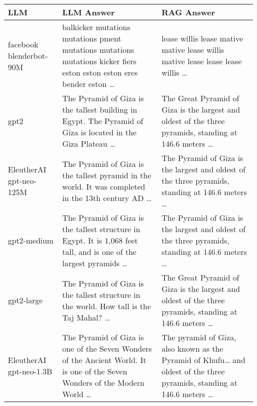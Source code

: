 \documentclass[11pt]{wseas}
\begin{document}
\begin{longtable}[]{@{}
  >{\raggedright\arraybackslash}p{}
  >{\raggedright\arraybackslash}p{}
  >{\raggedright\arraybackslash}p{}@{}}
\toprule\noalign{}
\begin{minipage}[b]{\linewidth}\raggedright
LLM
\end{minipage} & \begin{minipage}[b]{\linewidth}\raggedright
LLM Answer
\end{minipage} & \begin{minipage}[b]{\linewidth}\raggedright
RAG Answer
\end{minipage} \\
\midrule\noalign{}
\endhead
\bottomrule\noalign{}
\endlastfoot
facebook blenderbot-90M & balkicker mutations mutations pment mutations
mutations mutations kicker fiers eston eston eston eres bender eston
\ldots{} & lease willis lease mative mative lease willis mative lease
lease lease willis \ldots{} \\
gpt2 & The Pyramid of Giza is the tallest building in Egypt. The Pyramid
of Giza is located in the Giza Plateau \ldots{} & The Great Pyramid of
Giza is the largest and oldest of the three pyramids, standing at 146.6
meters \ldots{} \\
EleutherAI gpt-neo-125M & The Pyramid of Giza is the tallest pyramid in
the world. It was completed in the 13th century AD \ldots{} & The
Pyramid of Giza is the largest and oldest of the three pyramids,
standing at 146.6 meters \ldots{} \\
gpt2-medium & The Pyramid of Giza is the tallest structure in Egypt. It
is 1,068 feet tall, and is one of the largest pyramids \ldots{} & The
Pyramid of Giza is the largest and oldest of the three pyramids,
standing at 146.6 meters \ldots{} \\
gpt2-large & The Pyramid of Giza is the tallest structure in the world.
How tall is the Taj Mahal? \ldots{} & The Great Pyramid of Giza is the
largest and oldest of the three pyramids, standing at 146.6 meters
\ldots{} \\
EleutherAI gpt-neo-1.3B & The Pyramid of Giza is one of the Seven
Wonders of the Ancient World. It is one of the Seven Wonders of the
Modern World \ldots{} & The pyramid of Giza, also known as the Pyramid
of Khufu\ldots{} and oldest of the three pyramids, standing at 146.6
meters \ldots{} \\
\end{longtable}
\end{document}
